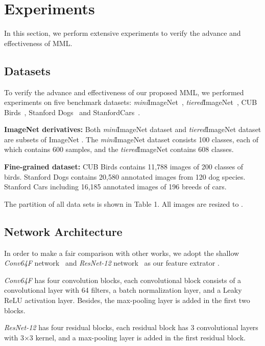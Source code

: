 \documentclass[10pt,twocolumn,letterpaper]{article}
\begin{document}
\section{Experiments}
In this section, we perform extensive experiments to verify the advance and effectiveness of MML. 
\subsection{Datasets}
To verify the advance and effectiveness of our proposed MML, we performed experiments on five benchmark datasets: \emph{mini}ImageNet~\cite{finn2017model}, \emph{tiered}ImageNet~\cite{ren18iclr}, CUB Birds~\cite{wah2011caltech}, Stanford Dogs~\cite{khosla2011novel} and StanfordCars~\cite{krause20133d}.

\textbf{ImageNet derivatives:} Both \emph{mini}ImageNet dataset and \emph{tiered}ImageNet dataset are subsets of ImageNet \cite{deng2009imagenet}. The \emph{mini}ImageNet dataset consists 100 classes, each of which contains 600 samples, and the \emph{tiered}ImageNet contains 608 classes.


\textbf{Fine-grained dataset:} CUB Birds contains 11,788 images of 200 classes of birds. Stanford Dogs contains 20,580 annotated images from 120 dog species. Stanford Cars including 16,185 annotated images of 196 breeds of cars.

The partition of all data sets is shown in Table 1. All images are resized to .

\subsection{Network Architecture}
In order to make a fair comparison with other works, we adopt the shallow \emph{Conv64F} network~\cite{li2019distribution,li2019revisiting} and \emph{ResNet-12} network~\cite{cvprLeeMRS19} as our feature extrator . 

\emph{Conv64F} has four convolution blocks, each convolutional block consists of a convolutional layer with 64  filters, a batch normalization layer, and a Leaky ReLU activation layer. Besides, the  max-pooling layer is added in the first two blocks.

\emph{ResNet-12} has four residual blocks, each residual block has 3 convolutional layers with 3×3 kernel, and a  max-pooling layer is added in the first residual block.
\end{document}
